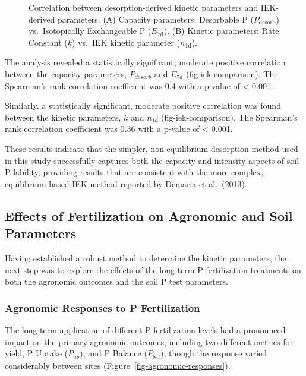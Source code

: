 \documentclass[
  a4paper,
]{article}
\begin{document}
\begin{figure}
\begin{minipage}{0.50\linewidth}
{}


\end{minipage}%

\caption{\label{fig-iek-comparison}Correlation between
desorption-derived kinetic parameters and IEK-derived parameters. (A)
Capacity parameters: Desorbable P (\(P_{\text{desorb}}\))
vs.~Isotopically Exchangeable P (\(E_{\text{7d}}\)). (B) Kinetic
parameters: Rate Constant (\(k\)) vs.~IEK kinetic parameter
(\(n_{\text{1d}}\)).}

\end{figure}%

The analysis revealed a statistically significant, moderate positive
correlation between the capacity parameters, \(P_{desorb}\) and
\(E_{7d}\) (fig-iek-comparison). The Spearman's rank correlation
coefficient was 0.4 with a p-value of \textless{} 0.001.

Similarly, a statistically significant, moderate positive correlation
was found between the kinetic parameters, \(k\) and \(n_{1d}\)
(fig-iek-comparison). The Spearman's rank correlation coefficient was
0.36 with a p-value of \textless{} 0.001.

These results indicate that the simpler, non-equilibrium desorption
method used in this study successfully captures both the capacity and
intensity aspects of soil P lability, providing results that are
consistent with the more complex, equilibrium-based IEK method reported
by Demaria et al.~(2013).

\subsection{Effects of Fertilization on Agronomic and Soil
Parameters}\label{sec-effects-of-fertilization-on-agronomic-and-soil-parameters}

Having established a robust method to determine the kinetic parameters,
the next step was to explore the effects of the long-term P
fertilization treatments on both the agronomic outcomes and the soil P
test parameters.

\subsubsection{Agronomic Responses to P
Fertilization}\label{sec-agronomic-responses-to-p-fertilization}

The long-term application of different P fertilization levels had a
pronounced impact on the primary agronomic outcomes, including two
different metrics for yield, P Uptake (\(P_{up}\)), and P Balance
(\(P_{bal}\)), though the response varied considerably between sites
(Figure~\ref{fig-agronomic-responses}).
\end{document}
